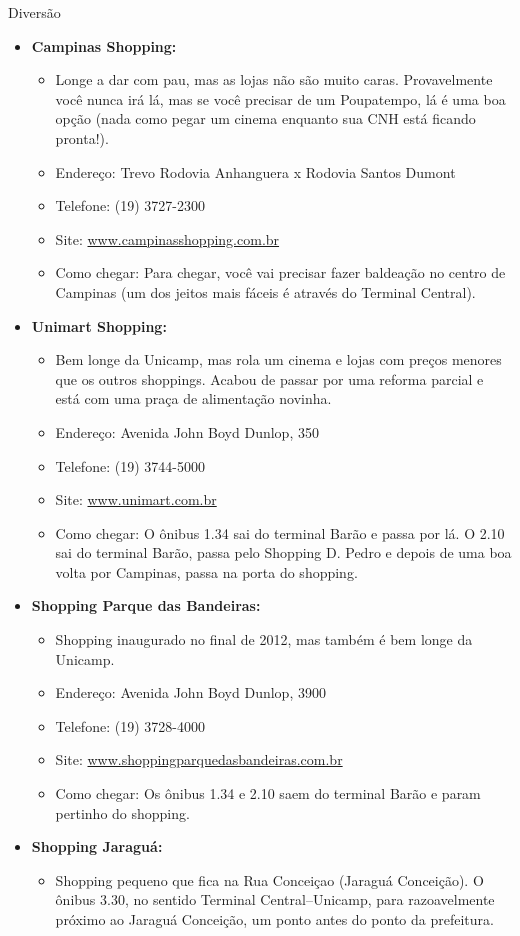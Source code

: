 \begin{story}{Diversão}
\begin{itemize}
\item \textbf{Campinas Shopping:}
\begin{itemize}
\item Longe a dar com pau, mas as lojas não são muito caras. Provavelmente você nunca irá lá, mas se você precisar de um Poupatempo, lá é uma boa opção (nada como pegar um cinema enquanto sua CNH está ficando pronta!).
\item Endereço: Trevo Rodovia Anhanguera x Rodovia Santos Dumont
\item Telefone: (19) 3727-2300
\item Site: \url{www.campinasshopping.com.br}
\item Como chegar: Para chegar, você vai precisar fazer baldeação no centro de Campinas (um dos jeitos mais fáceis é através do Terminal Central).
\end{itemize}

\item \textbf{Unimart Shopping:}
\begin{itemize}
\item Bem longe da Unicamp, mas rola um cinema e lojas com preços menores que os outros shoppings. Acabou de passar por uma reforma parcial e está com uma praça de alimentação novinha.
\item Endereço: Avenida John Boyd Dunlop, 350
\item Telefone: (19) 3744-5000
\item Site: \url{www.unimart.com.br}
\item Como chegar: O ônibus 1.34 sai do terminal Barão e passa por lá. O 2.10 sai do terminal Barão, passa pelo Shopping D. Pedro e depois de uma boa volta por Campinas, passa na porta do shopping.
\end{itemize}

\item \textbf{Shopping Parque das Bandeiras:}
\begin{itemize}
\item Shopping inaugurado no final de 2012, mas também é bem longe da Unicamp.
\item Endereço: Avenida John Boyd Dunlop, 3900
\item Telefone: (19) 3728-4000
\item Site: \url{www.shoppingparquedasbandeiras.com.br}
\item Como chegar: Os ônibus 1.34 e 2.10 saem do terminal Barão e param pertinho do shopping.
\end{itemize}

\item \textbf{Shopping Jaraguá:}
\begin{itemize}
\item Shopping pequeno que fica na Rua Conceiçao (Jaraguá Conceição). O ônibus 3.30, no sentido Terminal Central–Unicamp, para razoavelmente próximo ao Jaraguá Conceição, um ponto antes do ponto da prefeitura.
\end{itemize}


\end{itemize}
\end{story}
